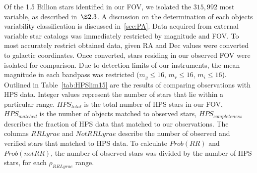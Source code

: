 \documentclass[aps,prb,twocolumn,superscriptaddress]{revtex4-1}
\begin{document}
Of the 1.5 Billion stars identified in our FOV, we isolated the $315,992$ most variable, 
as described in~$\S 2.3$.  %
A discussion on the determination of each objects variability classification is discussed in~\cref{sec:PA}.  Data acquired from external 
variable star catalogs was immediately restricted by magnitude and FOV.  
To most accurately restrict obtained data, given RA and Dec values were converted to galactic coordinates.  Once converted, 
stars residing in our observed FOV were isolated for comparison.  Due to detection limits of our instruments, the mean 
magnitude in each bandpass was restricted ($m_{g}\leq16$, $m_{r}\leq16$, $m_{i}\leq16$).
Outlined in Table~\ref{tab:HPSlim15} are the results of comparing observations with HPS data.  Integer values represent the number of stars that lie within a particular range.  
$HPS_{total}$ is the total number of HPS stars in our FOV, $HPS_{matched}$ is the number of objects matched to observed stars, $HPS_{completeness}$ describes the fraction of HPS data that matched to our observations.  The columns $RR Lyrae$ and $Not RR Lyrae$ describe the 
number of observed and verified stars that matched to HPS data.  To calculate $Prob(RR)$ and $Prob(notRR)$, the number of observed stars was 
divided by the number of HPS stars, for each $\rho_{RRLyrae}$ range.

\end{document}
